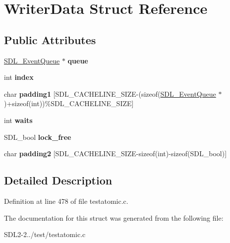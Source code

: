 \hypertarget{structWriterData}{\section{Writer\+Data Struct Reference}
\label{structWriterData}
}
\subsection*{Public Attributes}
\begin{DoxyCompactItemize}
\item 
\hypertarget{structWriterData_a4dd9356d279d59559971ed4d0015228f}{\hyperlink{structSDL__EventQueue}{S\+D\+L\+\_\+\+Event\+Queue} $\ast$ {\bfseries queue}}\label{structWriterData_a4dd9356d279d59559971ed4d0015228f}

\item 
\hypertarget{structWriterData_a3b86410f4a64340f0e0c92e4274c953f}{int {\bfseries index}}\label{structWriterData_a3b86410f4a64340f0e0c92e4274c953f}

\item 
\hypertarget{structWriterData_a36d6ffb48f4089b190daccd62f2edfbf}{char {\bfseries padding1} \mbox{[}S\+D\+L\+\_\+\+C\+A\+C\+H\+E\+L\+I\+N\+E\+\_\+\+S\+I\+Z\+E-\/(sizeof(\hyperlink{structSDL__EventQueue}{S\+D\+L\+\_\+\+Event\+Queue} $\ast$)+sizeof(int))\%S\+D\+L\+\_\+\+C\+A\+C\+H\+E\+L\+I\+N\+E\+\_\+\+S\+I\+Z\+E\mbox{]}}\label{structWriterData_a36d6ffb48f4089b190daccd62f2edfbf}

\item 
\hypertarget{structWriterData_ac3554d71d52d39d4b972d74a9b67f678}{int {\bfseries waits}}\label{structWriterData_ac3554d71d52d39d4b972d74a9b67f678}

\item 
\hypertarget{structWriterData_ae97f71fc614c7d01fbb83fc3bd497617}{S\+D\+L\+\_\+bool {\bfseries lock\+\_\+free}}\label{structWriterData_ae97f71fc614c7d01fbb83fc3bd497617}

\item 
\hypertarget{structWriterData_a47f79e859ec21455f9d18b2e1198c8ca}{char {\bfseries padding2} \mbox{[}S\+D\+L\+\_\+\+C\+A\+C\+H\+E\+L\+I\+N\+E\+\_\+\+S\+I\+Z\+E-\/sizeof(int)-\/sizeof(S\+D\+L\+\_\+bool)\mbox{]}}\label{structWriterData_a47f79e859ec21455f9d18b2e1198c8ca}

\end{DoxyCompactItemize}


\subsection{Detailed Description}


Definition at line 478 of file testatomic.\+c.



The documentation for this struct was generated from the following file\+:\begin{DoxyCompactItemize}
\item 
S\+D\+L2-\/2../test/testatomic.\+c\end{DoxyCompactItemize}
